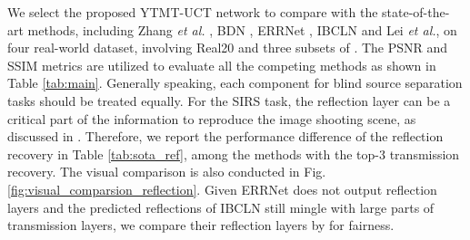 \documentclass{article}
\begin{document}
\begin{table}[t]
  \centering
  \caption{Quantitative results on the testing samples from Nature dataset of different methods. The best results are highlighted in \textcolor{red}{red} and the second best results in \textcolor{blue}{blue}.}
  \label{tab:nature}
\end{table}

We select the proposed YTMT-UCT network to compare with the state-of-the-art methods, including Zhang \emph{et al.} \cite{DBLP:conf/cvpr/ZhangNC18a}, BDN \cite{DBLP:conf/eccv/YangGLS18}, ERRNet \cite{DBLP:conf/cvpr/WeiYFW019}, IBCLN \cite{DBLP:conf/cvpr/LiY0LH20} and Lei \emph{et al.}\cite{DBLP:conf/cvpr/LeiHZYSC20}, on four real-world dataset, involving Real20 \cite{DBLP:conf/cvpr/ZhangNC18a} and three subsets of  \cite{DBLP:conf/iccv/WanSDTK17}. The PSNR and SSIM metrics are utilized to evaluate all the competing methods as shown in Table \ref{tab:main}. Generally speaking, each component for blind source separation tasks should be treated equally. For the SIRS task, the reflection layer can be a critical part of the information to reproduce the image shooting scene, as discussed in \cite{DBLP:conf/cvpr/WanSLDK20}. Therefore, we report the performance difference of the reflection recovery in Table \ref{tab:sota_ref}, among the methods with the top-3 transmission recovery. The visual comparison is also conducted in Fig. \ref{fig:visual_comparsion_reflection}. Given ERRNet does not output reflection layers and the predicted reflections of IBCLN still mingle with large parts of transmission layers, we compare their reflection layers by  for fairness. 
\end{document}
